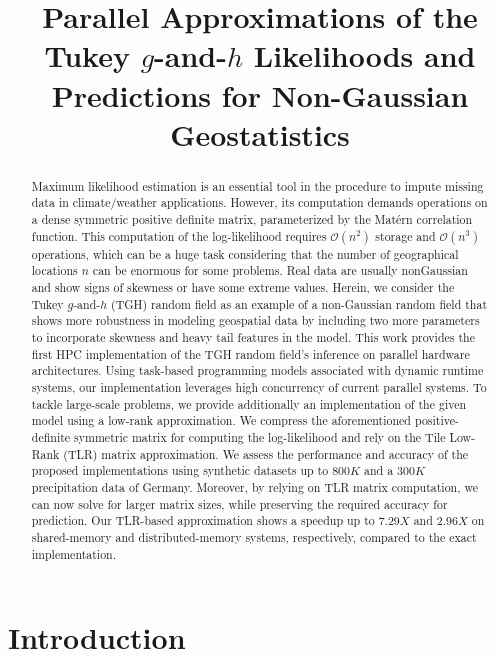 \documentclass[conference]{IEEEtran}
\begin{document}
\title{Parallel Approximations of the Tukey $g$-and-$h$  Likelihoods and Predictions for Non-Gaussian Geostatistics}




\maketitle

\begin{abstract}

Maximum likelihood estimation is an essential tool in
the procedure to impute missing data in climate/weather
applications. However, its computation demands operations
on a dense symmetric positive definite matrix, parameterized by
the Mat\'ern correlation function. This computation of the log-likelihood requires $\mathcal{O}(n^2)$ storage 
and $\mathcal{O}(n^3)$ operations, which can be a 
huge task considering that the number of geographical 
locations $n$ can be enormous for some problems.  
Real data are usually nonGaussian and show signs of skewness or have some extreme values. Herein, we consider the Tukey $g$-and-$h$ (TGH) random field as an example
of a non-Gaussian random field that shows more robustness in modeling geospatial data by including two more parameters 
to incorporate skewness and heavy tail features in the model. 
This work provides the first HPC implementation of the TGH 
random field's inference on parallel hardware architectures. 
Using task-based programming models associated with dynamic runtime systems, our implementation leverages high concurrency of current parallel systems. To tackle large-scale problems, we provide additionally an implementation of the given model  using a low-rank approximation. We compress the aforementioned positive-definite symmetric matrix for computing the log-likelihood and rely on the Tile Low-Rank (TLR) matrix
approximation. We assess the performance and accuracy of the proposed implementations using synthetic 
datasets up to $800K$ and a $300K$ precipitation data of Germany. Moreover, by relying on TLR matrix computation, we 
can now solve for larger matrix sizes, while preserving the required accuracy for prediction. Our TLR-based approximation shows a 
speedup up to $7.29X$ and $2.96X$ on shared-memory and distributed-memory systems, respectively, compared
to the exact implementation. 

\end{abstract}

\section{Introduction}
\end{document}

